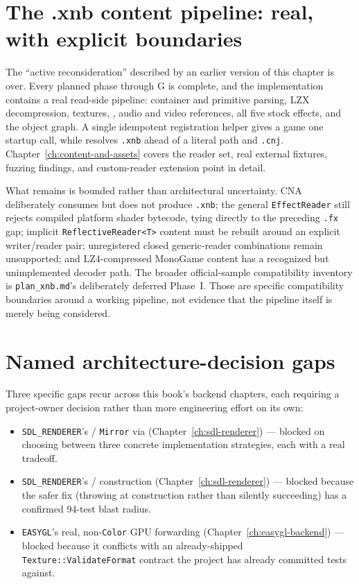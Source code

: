 \section{The .xnb content pipeline: real, with explicit boundaries}

The ``active reconsideration'' described by an earlier version of this chapter is over.
Every planned phase through G is complete, and the implementation contains a
real read-side pipeline: container and primitive parsing, LZX decompression, textures,
, audio and video references, all five stock effects, and the
 object graph. A single idempotent registration helper gives a game one
startup call, while  resolves \texttt{.xnb} ahead of a
literal path and \texttt{.cnj}. Chapter~\ref{ch:content-and-assets} covers the reader set,
real external fixtures, fuzzing findings, and custom-reader extension point in detail.

What remains is bounded rather than architectural uncertainty. CNA deliberately consumes but
does not produce \texttt{.xnb}; the general \texttt{EffectReader} still rejects compiled
platform shader bytecode, tying directly to the preceding \texttt{.fx} gap; implicit
\texttt{ReflectiveReader<T>} content must be rebuilt around an explicit writer/reader pair;
unregistered closed generic-reader combinations remain unsupported; and LZ4-compressed
MonoGame content has a recognized but unimplemented decoder path. The broader official-sample
compatibility inventory is \texttt{plan\_xnb.md}'s deliberately deferred Phase~I. Those are
specific compatibility boundaries around a working pipeline, not evidence that the pipeline
itself is merely being considered.

\section{Named architecture-decision gaps}

Three specific gaps recur across this book's backend chapters, each requiring a project-owner
decision rather than more engineering effort on its own:

\begin{itemize}
  \item \texttt{SDL\_RENDERER}'s  / \texttt{Mirror} via
         (Chapter~\ref{ch:sdl-renderer}) --- blocked on choosing between
        three concrete implementation strategies, each with a real tradeoff.
  \item \texttt{SDL\_RENDERER}'s  /  construction
        (Chapter~\ref{ch:sdl-renderer}) --- blocked because the safer fix (throwing at
        construction rather than silently succeeding) has a confirmed 94-test blast radius.
  \item \texttt{EASYGL}'s real, non-\texttt{Color}  GPU forwarding
        (Chapter~\ref{ch:easygl-backend}) --- blocked because it conflicts with an
        already-shipped \texttt{Texture::ValidateFormat} contract the project has already
        committed tests against.
\end{itemize}


